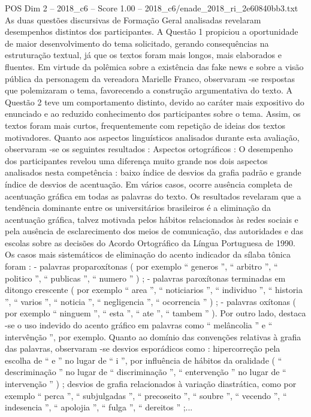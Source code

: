 \begin{textsample}{POS Dim 2 – 2018\_c6 – Score 1.00 – 2018\_c6/enade\_2018\_ri\_2e60840bb3.txt}
As duas questões discursivas de Formação Geral analisadas revelaram desempenhos distintos dos participantes.
A Questão 1 propiciou a oportunidade de maior desenvolvimento do tema solicitado, gerando consequências na estruturação textual, já que os textos foram mais longos, mais elaborados e fluentes.
Em virtude da polêmica sobre a existência das fake news e sobre a visão pública da personagem da vereadora Marielle Franco, observaram -se respostas que polemizaram o tema, favorecendo a construção argumentativa do texto.
A Questão 2 teve um comportamento distinto, devido ao caráter mais expositivo do enunciado e ao reduzido conhecimento dos participantes sobre o tema.
Assim, os textos foram mais curtos, frequentemente com repetição de ideias dos textos motivadores.
Quanto aos aspectos linguísticos analisados durante esta avaliação, observaram -se os seguintes resultados : Aspectos ortográficos : O desempenho dos participantes revelou uma diferença muito grande nos dois aspectos analisados nesta competência : baixo índice de desvios da grafia padrão e grande índice de desvios de acentuação.
Em vários casos, ocorre ausência completa de acentuação gráfica em todas as palavras do texto.
Os resultados revelaram que a tendência dominante entre os universitários brasileiros é a eliminação da acentuação gráfica, talvez motivada pelos hábitos relacionados às redes sociais e pela ausência de esclarecimento dos meios de comunicação, das autoridades e das escolas sobre as decisões do Acordo Ortográfico da Língua Portuguesa de 1990.
Os casos mais sistemáticos de eliminação do acento indicador da sílaba tônica foram : - palavras proparoxítonas ( por exemplo “ generos ”, “ arbitro ”, “ politico ”, “ publicas ”, “ numero ” ) ; - palavras paroxítonas terminadas em ditongo crescente ( por exemplo “ area ”, “ noticiarios ”, “ individuo ”, “ historia ”, “ varios ”, “ noticia ”, “ negligencia ”, “ ocorrencia ” ) ; - palavras oxítonas ( por exemplo “ ninguem ”, “ esta ”, “ ate ”, “ tambem ” ).
Por outro lado, destaca -se o uso indevido do acento gráfico em palavras como “ melâncolia ” e “ intervênção ”, por exemplo.
Quanto ao domínio das convenções relativas à grafia das palavras, observaram -se desvios esporádicos como : hipercorreção pela escolha de “ e ” no lugar de “ i ”, por influência de hábitos da oralidade ( “ descriminação ” no lugar de “ discriminação ”, “ entervenção ” no lugar de “ intervenção ” ) ; desvios de grafia relacionados à variação diastrática, como por exemplo “ perca ”, “ subjulgadas ”, “ precoseito ”, “ soubre ”, “ vecendo ”, “ indesencia ”, “ apolojia ”, “ fulga ”, “ dereitos ” ;...

\end{textsample}
